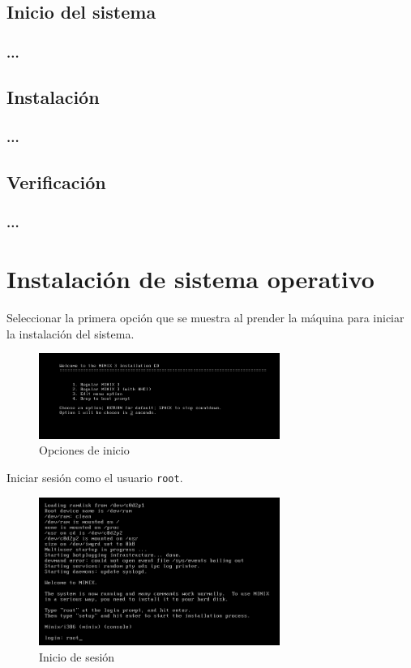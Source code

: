 \documentclass[12pt]{article}
\begin{document}
\subsection*{Inicio del sistema}
\subsubsection*{...}

\subsection*{Instalación}
\subsubsection*{...}

\subsection*{Verificación}
\subsubsection*{...}


\section{Instalación de sistema operativo}\label{instalacion}

Seleccionar la primera opción que se muestra al prender la máquina para iniciar la instalación del sistema.
\begin{figure}[H]
  \centering
  \includegraphics[width=0.7\textwidth]{vm/min15.png}
  \caption{Opciones de inicio}
\end{figure}

Iniciar sesión como el usuario \texttt{root}.
\begin{figure}[H]
  \centering
  \includegraphics[width=0.7\textwidth]{vm/min16.png}
  \caption{Inicio de sesión}
\end{figure}
\end{document}
